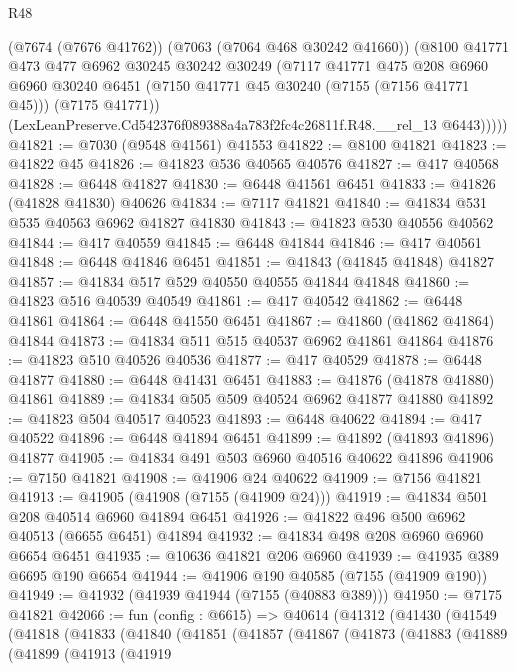 \begin{lexlean}{R48}
\begin{coremodule}
          (@7674 (@7676 @41762))
          (@7063 (@7064 @468 @30242 @41660))
          (@8100
            @41771
            @473
            @477
            @6962
            @30245
            @30242
            @30249
            (@7117
              @41771
              @475
              @208
              @6960
              @6960
              @30240
              @6451
              (@7150 @41771 @45 @30240 (@7155 (@7156 @41771 @45)))
              (@7175 @41771))
            (LexLeanPreserve.Cd542376f089388a4a783f2fc4c26811f.R48.__rel_13 @6443)))))
@41821 := @7030 (@9548 @41561) @41553
@41822 := @8100 @41821
@41823 := @41822 @45
@41826 := @41823 @536 @40565 @40576
@41827 := @417 @40568
@41828 := @6448 @41827
@41830 := @6448 @41561 @6451
@41833 := @41826 (@41828 @41830) @40626
@41834 := @7117 @41821
@41840 := @41834 @531 @535 @40563 @6962 @41827 @41830
@41843 := @41823 @530 @40556 @40562
@41844 := @417 @40559
@41845 := @6448 @41844
@41846 := @417 @40561
@41848 := @6448 @41846 @6451
@41851 := @41843 (@41845 @41848) @41827
@41857 := @41834 @517 @529 @40550 @40555 @41844 @41848
@41860 := @41823 @516 @40539 @40549
@41861 := @417 @40542
@41862 := @6448 @41861
@41864 := @6448 @41550 @6451
@41867 := @41860 (@41862 @41864) @41844
@41873 := @41834 @511 @515 @40537 @6962 @41861 @41864
@41876 := @41823 @510 @40526 @40536
@41877 := @417 @40529
@41878 := @6448 @41877
@41880 := @6448 @41431 @6451
@41883 := @41876 (@41878 @41880) @41861
@41889 := @41834 @505 @509 @40524 @6962 @41877 @41880
@41892 := @41823 @504 @40517 @40523
@41893 := @6448 @40622
@41894 := @417 @40522
@41896 := @6448 @41894 @6451
@41899 := @41892 (@41893 @41896) @41877
@41905 := @41834 @491 @503 @6960 @40516 @40622 @41896
@41906 := @7150 @41821
@41908 := @41906 @24 @40622
@41909 := @7156 @41821
@41913 := @41905 (@41908 (@7155 (@41909 @24)))
@41919 := @41834 @501 @208 @40514 @6960 @41894 @6451
@41926 := @41822 @496 @500 @6962 @40513 (@6655 @6451) @41894
@41932 := @41834 @498 @208 @6960 @6960 @6654 @6451
@41935 := @10636 @41821 @206 @6960
@41939 := @41935 @389 @6695 @190 @6654
@41944 := @41906 @190 @40585 (@7155 (@41909 @190))
@41949 := @41932 (@41939 @41944 (@7155 (@40883 @389)))
@41950 := @7175 @41821
@42066 := fun (config : @6615) =>
  @40614
    (@41312
      (@41430
        (@41549
          (@41818
            (@41833
              (@41840
                (@41851
                  (@41857
                    (@41867
                      (@41873
                        (@41883
                          (@41889
                            (@41899
                              (@41913
                                (@41919

\end{coremodule}
\end{lexlean}
